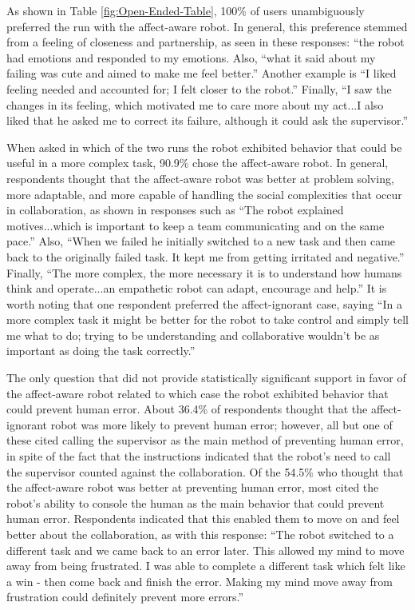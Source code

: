 \documentclass[12pt]{report}
\begin{document}
As shown in Table \ref{fig:Open-Ended-Table}, 100\% of users unambiguously
preferred the run with the affect-aware robot. In general, this preference
stemmed from a feeling of closeness and partnership, as seen in these responses:
``the robot had emotions and responded to my emotions. Also, ``what it said about
my failing was cute and aimed to make me feel better.'' Another example is ``I
liked feeling needed and accounted for; I felt closer to the robot.'' Finally,
``I saw the changes in its feeling, which motivated me to care more about my
act...I also liked that he asked me to correct its failure, although it could
ask the supervisor.''  

When asked in which of the two runs the robot exhibited behavior that could be
useful in a more complex task, 90.9\% chose the affect-aware robot. In general,
respondents thought that the affect-aware robot was better at problem solving,
more adaptable, and more capable of handling the social complexities that occur
in collaboration, as shown in responses such as ``The robot explained
motives...which is important to keep a team communicating and on the same
pace.'' Also, ``When we failed he initially switched to a new task and then came
back to the originally failed task. It kept me from getting irritated and
negative.'' Finally, ``The more complex, the more necessary it is to understand
how humans think and operate...an empathetic robot can adapt, encourage and
help.'' It is worth noting that one respondent preferred the affect-ignorant
case, saying ``In a more complex task it might be better for the robot to take
control and simply tell me what to do; trying to be understanding and
collaborative wouldn't be as important as doing the task correctly.''

The only question that did not provide statistically significant support in
favor of the affect-aware robot related to which case the robot exhibited
behavior that could prevent human error. About 36.4\% of respondents thought
that the affect-ignorant robot was more likely to prevent human error; however, all
but one of these cited calling the supervisor as the main method of preventing
human error, in spite of the fact that the instructions indicated that the
robot's need to call the supervisor counted against the collaboration. Of the
54.5\% who thought that the affect-aware robot was better at preventing human
error, most cited the robot's ability to console the human as the main behavior
that could prevent human error. Respondents indicated that this enabled them to
move on and feel better about the collaboration, as with this response: ``The
robot switched to a different task and we came back to an error later. This
allowed my mind to move away from being frustrated. I was able to complete a
different task which felt like a win - then come back and finish the error.
Making my mind move away from frustration could definitely prevent more
errors.''
\end{document}
